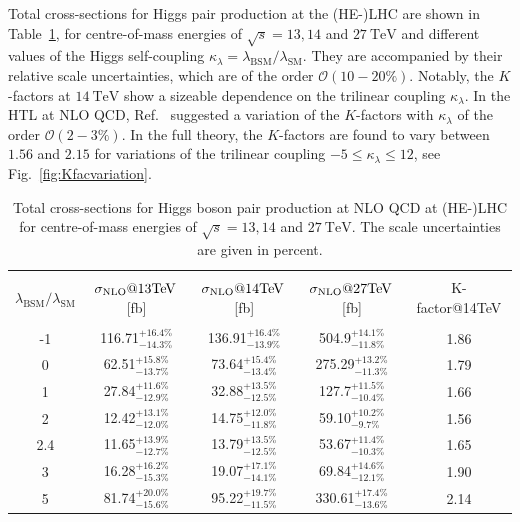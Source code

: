 \documentclass[a4paper]{jpconf}
\newcommand{\TeV}{\ensuremath{\mathrm{\:TeV}}}
\newcommand{\chhh}{\ensuremath{\kappa_{\lambda}}}
\begin{document}
Total cross-sections for Higgs pair production at the (HE-)LHC are shown in Table~\ref{tab:sigmatot}, for centre-of-mass energies of $\sqrt{s}=13,14$ and $27 \TeV$ and different values of the Higgs self-coupling $\chhh = \lambda_{\mathrm{BSM}} / \lambda_{\mathrm{SM}}$. They are accompanied by their relative scale uncertainties, which are of the order $\mathcal{O}(10-20\%)$. Notably, the $K$-factors at $14 \TeV$ show a sizeable dependence on the trilinear coupling $\chhh$. In the HTL at NLO QCD, Ref.~\cite{Grober:2015cwa} suggested a variation of the $K$-factors with $\chhh$ of the order $\mathcal{O}(2-3\%)$. In the full theory, the $K$-factors are found to vary between $1.56$ and $2.15$ for variations of the trilinear coupling $-5 \leq \chhh \leq 12$, see Fig.~\ref{fig:Kfacvariation}. 

\begin{table}[htb!]
\begin{center}
\begin{tabular}{| c | c | c |c|c|}
\hline
&&&&\\
$\lambda_{\mathrm{BSM}}/\lambda_{\mathrm{SM}}$ & $\sigma_{\rm{NLO}}@13 \mathrm{TeV}$\,[fb]& $\sigma_{\rm{NLO}}@14 \mathrm{TeV}$\,[fb] & $\sigma_{\rm{NLO}}@27 \mathrm{TeV}$\,[fb] &K-factor@14TeV\\
&&&&\\
\hline
-1& 116.71$^{+16.4\%}_{-14.3\%}$  & 136.91$^{+16.4\%}_{-13.9\%}$& 504.9$^{+14.1\%}_{-11.8\%}$ & 1.86 \\
\hline
0& 62.51$^{+15.8\%}_{-13.7\%}$ & 73.64$^{+15.4\%}_{-13.4\%}$& 275.29$^{+13.2\%}_{-11.3\%}$& 1.79  \\
\hline 
1& 27.84$^{+11.6\%}_{-12.9\%}$ & 32.88$^{+13.5\%}_{-12.5\%}$&127.7$^{+11.5\%}_{-10.4\%}$ &1.66\\
\hline
2 & 12.42$^{+13.1\%}_{-12.0\%}$ & 14.75$^{+12.0\%}_{-11.8\%}$ &  59.10$^{+10.2\%}_{-9.7\%}$ & 1.56 \\
\hline
2.4& 11.65$^{+13.9\%}_{-12.7\%}$ & 13.79$^{+13.5\%}_{-12.5\%}$& 53.67$^{+11.4\%}_{-10.3\%}$ & 1.65 \\
\hline
3& 16.28$^{+16.2\%}_{-15.3\%}$ & 19.07$^{+17.1\%}_{-14.1\%}$ & 69.84$^{+14.6\%}_{-12.1\%}$ & 1.90 \\
\hline 
5& 81.74$^{+20.0\%}_{-15.6\%}$  & 95.22$^{+19.7\%}_{-11.5\%}$& 330.61$^{+17.4\%}_{-13.6\%}$ & 2.14 \\
\hline 
\end{tabular}
\end{center}
\caption{Total cross-sections  for Higgs boson pair production at NLO QCD at (HE-)LHC for centre-of-mass energies of $\sqrt{s}=13,14$ and $27 \TeV$. The scale uncertainties are given in percent.
\label{tab:sigmatot}}
\end{table}
\end{document}
